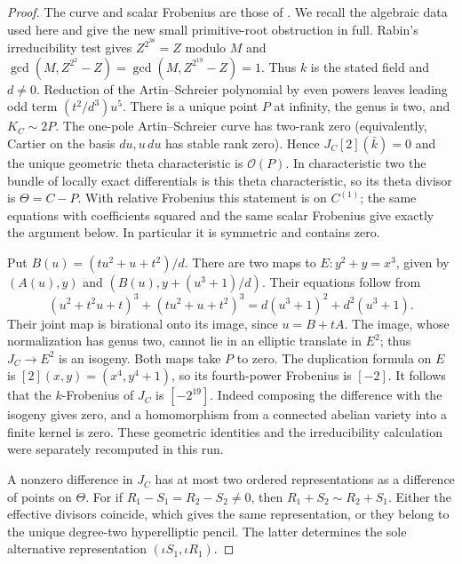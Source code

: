 \documentclass[11pt,a4paper]{article}
\begin{document}
\begin{proof}
The curve and scalar Frobenius are those of \cite[B.23]{A1run}.
We recall the algebraic data used here and give the new small
primitive-root obstruction in full. Rabin's irreducibility test gives
$Z^{2^{38}}=Z$ modulo $M$ and
$\gcd(M,Z^{2^2}-Z)=\gcd(M,Z^{2^{19}}-Z)=1$.
Thus $k$ is the stated field and $d\ne0$. Reduction of the
Artin--Schreier polynomial by even powers leaves leading odd term
$(t^2/d^3)u^5$. There is a unique point $P$ at infinity, the genus
is two, and $K_C\sim2P$. The one-pole Artin--Schreier curve has
two-rank zero (equivalently, Cartier on the basis $du,u\,du$ has
stable rank zero). Hence $J_C[2](\bar k)=0$ and the unique geometric
theta characteristic is $\mathcal O(P)$. In characteristic two
the bundle of locally exact differentials is this theta characteristic,
so its theta divisor is $\Theta=C-P$. With relative Frobenius this
statement is on $C^{(1)}$; the same equations with coefficients squared
and the same scalar Frobenius give exactly the argument below.
In particular it is symmetric
and contains zero.

Put $B(u)=(tu^2+u+t^2)/d$. There are two maps to
$E:y^2+y=x^3$, given by $(A(u),y)$ and
$(B(u),y+(u^3+1)/d)$. Their equations follow from
\[
 (u^2+t^2u+t)^3+(tu^2+u+t^2)^3
 =d(u^3+1)^2+d^2(u^3+1).
\]
Their joint map is birational onto its image, since $u=B+tA$.
The image, whose normalization has genus two, cannot lie in an
elliptic translate in $E^2$; thus $J_C\to E^2$ is an isogeny.
Both maps take $P$ to zero. The duplication formula on $E$ is
$[2](x,y)=(x^4,y^4+1)$, so its fourth-power Frobenius is $[-2]$.
It follows that the $k$-Frobenius of $J_C$ is $[-2^{19}]$.
Indeed composing the difference with the isogeny gives zero,
and a homomorphism from a connected abelian variety into a finite
kernel is zero. These geometric identities and the irreducibility
calculation were separately recomputed in this run.

A nonzero difference in $J_C$ has at most two ordered representations
as a difference of points on $\Theta$. For if
$R_1-S_1=R_2-S_2\ne0$, then
$R_1+S_2\sim R_2+S_1$. Either the effective divisors coincide,
which gives the same representation, or they belong to the unique
degree-two hyperelliptic pencil. The latter determines the sole
alternative representation $(\iota S_1,\iota R_1)$.


\end{proof}
\end{document}
